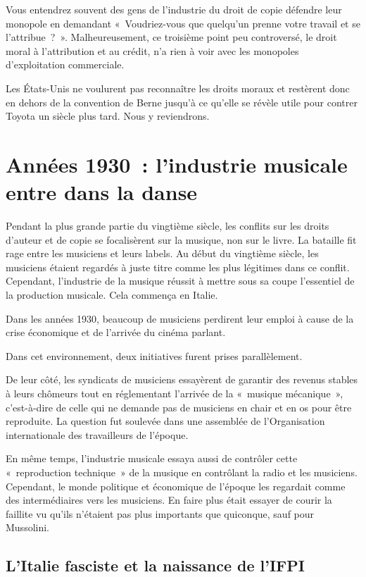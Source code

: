 Vous
entendrez souvent des gens de l'industrie du droit de copie défendre leur monopole en demandant «~Voudriez-vous que quelqu'un prenne votre travail et se l'attribue~?~». Malheureusement, ce troisième
point peu controversé, le droit moral à l'attribution et au crédit, n'a rien à voir avec les monopoles d'exploitation commerciale.

Les États-Unis ne voulurent pas reconnaître les droits moraux et restèrent donc en dehors de la convention de Berne jusqu'à ce qu'elle se révèle utile pour contrer Toyota un siècle plus tard. Nous y
reviendrons.

\section{Années 1930~: l'industrie musicale entre dans la danse}
Pendant la plus grande partie du vingtième siècle, les conflits sur les droits d'auteur et de copie se focalisèrent sur la musique, non sur le livre. La bataille fit rage entre les musiciens et leurs
labels. Au début du vingtième siècle, les musiciens étaient
regardés à juste titre comme les plus légitimes dans ce conflit. Cependant, l'industrie de la musique réussit à mettre sous sa coupe l'essentiel de la production musicale. Cela commença en Italie. 

Dans les années 1930, beaucoup de musiciens perdirent leur emploi à cause de la crise économique et de l'arrivée du cinéma parlant.

Dans cet environnement, deux initiatives furent prises parallèlement. 

De leur côté, les syndicats de musiciens essayèrent de garantir des revenus stables à leurs chômeurs tout en réglementant l'arrivée de la «~musique mécanique~», c'est-à-dire de celle qui
ne demande
pas de musiciens en chair et en os pour être reproduite. La question fut soulevée dans une assemblée de l'Organisation internationale des travailleurs de l'époque.

En même temps, l'industrie musicale essaya aussi de contrôler cette «~reproduction technique~» de la musique en contrôlant la radio et les musiciens. Cependant, le monde politique et économique de
l'époque les regardait comme des intermédiaires vers les musiciens. En faire plus était essayer de courir la faillite vu qu'ils n'étaient pas plus importants que quiconque, sauf pour Mussolini.

\subsection{L'Italie fasciste et la naissance de l'IFPI}

